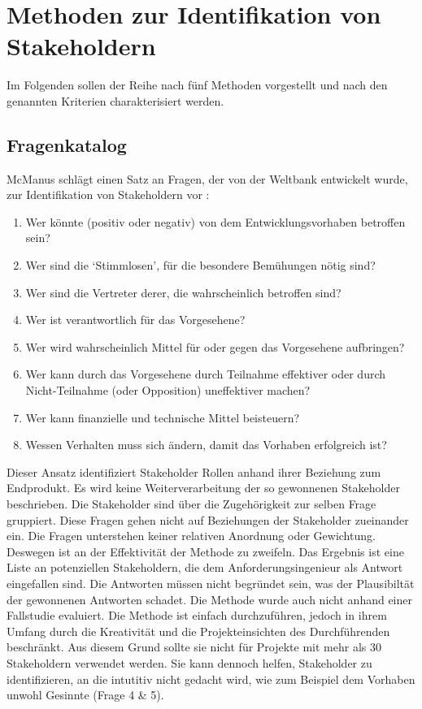 \section{Methoden zur Identifikation von Stakeholdern}

Im Folgenden sollen der Reihe nach fünf Methoden vorgestellt und nach den genannten Kriterien charakterisiert werden.  

\subsection{Fragenkatalog}

McManus schlägt einen Satz an Fragen, der von der Weltbank entwickelt wurde, zur Identifikation von Stakeholdern vor \cite{mcmanus}:

\begin{enumerate}
  \item Wer könnte (positiv oder negativ) von dem Entwicklungsvorhaben betroffen sein?
  \item Wer sind die `Stimmlosen', für die besondere Bemühungen nötig sind?
  \item Wer sind die Vertreter derer, die wahrscheinlich betroffen sind?
  \item Wer ist verantwortlich für das Vorgesehene?
  \item Wer wird wahrscheinlich Mittel für oder gegen das Vorgesehene aufbringen?
  \item Wer kann durch das Vorgesehene durch Teilnahme effektiver oder durch Nicht-Teilnahme (oder Opposition) uneffektiver machen?
  \item Wer kann finanzielle und technische Mittel beisteuern?
  \item Wessen Verhalten muss sich ändern, damit das Vorhaben erfolgreich ist?
\end{enumerate}

Dieser Ansatz identifiziert Stakeholder Rollen anhand ihrer Beziehung zum Endprodukt. Es wird keine Weiterverarbeitung der so gewonnenen Stakeholder beschrieben. Die Stakeholder sind über die Zugehörigkeit zur selben Frage gruppiert. Diese Fragen gehen nicht auf Beziehungen der Stakeholder zueinander ein. Die Fragen unterstehen keiner relativen Anordnung oder Gewichtung. Deswegen ist an der Effektivität der Methode zu zweifeln. Das Ergebnis ist eine Liste an potenziellen Stakeholdern, die dem Anforderungsingenieur als Antwort
eingefallen sind. Die Antworten müssen nicht begründet sein, was der Plausibiltät der gewonnenen Antworten schadet. Die Methode wurde auch nicht anhand einer Fallstudie evaluiert. Die Methode ist einfach durchzuführen, jedoch in ihrem Umfang durch die Kreativität und die Projekteinsichten des Durchführenden beschränkt. Aus diesem Grund sollte sie nicht für Projekte mit mehr als 30 Stakeholdern verwendet werden. Sie kann dennoch helfen, Stakeholder zu identifizieren, an die intutitiv nicht gedacht wird, wie zum Beispiel dem Vorhaben unwohl Gesinnte (Frage 4 \& 5).

